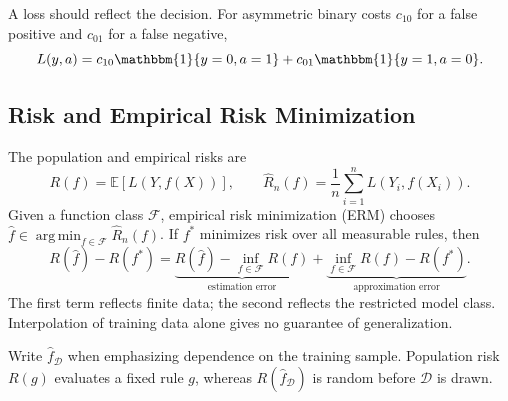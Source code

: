 \documentclass[12pt,oneside]{book}
\numberwithin{equation}{section}
\theoremstyle{definition}
\theoremstyle{plain}
\theoremstyle{remark}
\newcommand{\E}{\mathbb{E}}
\newcommand{\ind}{\mathbbm{1}}
\newcommand{\argmin}{\operatorname*{arg\,min}}
\begin{document}
A loss should reflect the decision. For asymmetric binary costs $c_{10}$ for
a false positive and $c_{01}$ for a false negative,
\[
 L(y,a)=c_{10}\ind\{y=0,a=1\}+c_{01}\ind\{y=1,a=0\}.
\]

\subsection{Risk and Empirical Risk Minimization}

The population and empirical risks are
\begin{equation}
 R(f)=\E[L(Y,f(X))],
 \qquad
 \widehat R_n(f)=\frac1n\sum_{i=1}^nL(Y_i,f(X_i)).
 \label{eq:learning-risk}
\end{equation}
Given a function class $\mathcal F$, empirical risk minimization (ERM) chooses
$\widehat f\in\argmin_{f\in\mathcal F}\widehat R_n(f)$. If $f^*$ minimizes
risk over all measurable rules, then
\[
 R(\widehat f)-R(f^*)=
 \underbrace{R(\widehat f)-\inf_{f\in\mathcal F}R(f)}_{\text{estimation error}}
 +\underbrace{\inf_{f\in\mathcal F}R(f)-R(f^*)}_{\text{approximation error}}.
\]
The first term reflects finite data; the second reflects the restricted model
class. Interpolation of training data alone gives no guarantee of
generalization.

Write $\widehat f_{\mathcal D}$ when emphasizing dependence on the training
sample. Population risk $R(g)$ evaluates a fixed rule $g$, whereas
$R(\widehat f_{\mathcal D})$ is random before $\mathcal D$ is drawn.
\end{document}
